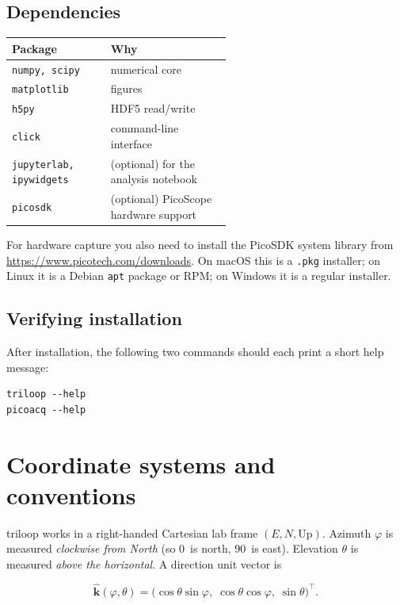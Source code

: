 \documentclass[11pt]{article}
\begin{document}
\subsection*{Dependencies}
\begin{tabular}{lp{0.55\linewidth}}
\toprule
\textbf{Package} & \textbf{Why} \\\midrule
\texttt{numpy, scipy} & numerical core \\
\texttt{matplotlib} & figures \\
\texttt{h5py} & HDF5 read/write \\
\texttt{click} & command-line interface \\
\texttt{jupyterlab, ipywidgets} & (optional) for the analysis notebook\\
\texttt{picosdk} & (optional) PicoScope hardware support\\\bottomrule
\end{tabular}

For hardware capture you also need to install the PicoSDK system
library from \url{https://www.picotech.com/downloads}.  On macOS this
is a \texttt{.pkg} installer; on Linux it is a Debian \texttt{apt}
package or RPM; on Windows it is a regular installer.

\subsection*{Verifying installation}

After installation, the following two commands should each print a
short help message:
\begin{lstlisting}[style=shell]
triloop --help
picoacq --help
\end{lstlisting}

\section{Coordinate systems and conventions}
\label{sec:conventions}

\textsf{triloop} works in a right-handed Cartesian lab frame
$(E, N, \mathrm{Up})$.  Azimuth $\varphi$ is measured \emph{clockwise
from North} (so 0\textdegree\ is north, 90\textdegree\ is east).
Elevation $\theta$ is measured \emph{above the horizontal}.
A direction unit vector is

\begin{equation}
\hat{\mathbf{k}}(\varphi, \theta) =
\bigl(\cos\theta \sin\varphi,\;
      \cos\theta \cos\varphi,\;
      \sin\theta\bigr)^{\!\top}.
\end{equation}
\end{document}
